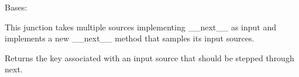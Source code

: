 \documentclass[letterpaper,10pt,english]{sphinxmanual}
\begin{document}
\begin{fulllineitems}
\label{\detokenize{Fireworks:Fireworks.toolbox.junctions.HubJunction}}
Bases: {\hyperref[\detokenize{Fireworks:Fireworks.core.junction.Junction}]{}}

This junction takes multiple sources implementing \_\_next\_\_ as input and implements a new \_\_next\_\_ method that samples
its input sources.

\begin{fulllineitems}
\label{\detokenize{Fireworks:Fireworks.toolbox.junctions.HubJunction.check_inputs}}
\end{fulllineitems}


\begin{fulllineitems}
\label{\detokenize{Fireworks:Fireworks.toolbox.junctions.HubJunction.reset}}
\end{fulllineitems}


\begin{fulllineitems}
\label{\detokenize{Fireworks:Fireworks.toolbox.junctions.HubJunction.sample_inputs}}
Returns the key associated with an input source that should be stepped through next.

\end{fulllineitems}


\end{fulllineitems}

\end{document}
